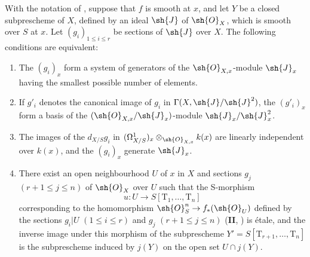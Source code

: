 \begin{corollary}[17.12.2]
\label{IV.17.12.2}
With the notation of , suppose that $f$ is smooth at $x$, and let $Y$ be a closed subprescheme of $X$, defined by an ideal $\sh{J}$ of $\sh{O}_X$, which is smooth over $S$ at $x$.
Let $(g_i)_{1\leq i\leq r}$ be sections of $\sh{J}$ over $X$.
The following conditions are equivalent:
\begin{enumerate}
  \item[a)] The $(g_i)_x$ form a system of generators of the $\sh{O}_{X,x}$-module $\sh{J}_x$ having the smallest possible number of elements.
  \item[b)] If $g'_i$ denotes the canonical image of $g_i$ in $\Gamma(X,\sh{J}/\sh{J}^2)$, the $(g'_i)_x$ form a basis of the $(\sh{O}_{X,x}/\sh{J}_x)$-module $\sh{J}_x/\sh{J}_x^2$.
  \item[c)] The images of the $d_{X/S}g_i$ in
  $(\Omega^1_{X/S})_x\otimes_{\sh{O}_{X,x}}k(x)$ are linearly independent over $k(x)$, and the $(g_i)_x$ generate $\sh{J}_x$.
  \item[d)] There exist an open neighbourhood $U$ of $x$ in $X$ and sections $g_j$ $(r+1\leq j\leq n)$ of $\sh{O}_X$ over $U$ such that the S-morphism
  \[
    u:U\longrightarrow S[\mathrm{T}_1,\ldots,\mathrm{T}_n]
  \]
  corresponding to the homomorphism $\sh{O}^n_S\to f_*(\sh{O}_U)$ defined by the sections $g_i|U$ $(1\leq i\leq r)$ and $g_j$ $(r+1\leq j\leq n)$ (\textbf{II}, ) is \'etale, and the inverse image under this morphism of the subprescheme
  $Y'=S[\mathrm{T}_{r+1},\ldots,\mathrm{T}_n]$
  is the subprescheme induced by $j(Y)$ on the open set $U\cap j(Y)$.
\end{enumerate}
\end{corollary}

